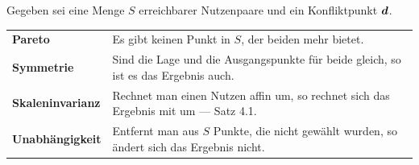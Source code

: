 \begin{merksatz}
Gegeben sei eine Menge $S$ erreichbarer Nutzenpaare und ein Konfliktpunkt $\boldsymbol{d}$.

\begin{center}
{\small
\renewcommand{\arraystretch}{1.55}
\begin{tabular}{@{}P{2.6cm}P{6.0cm}@{}}
\toprule
\textbf{Pareto} & Es gibt keinen Punkt in $S$, der beiden mehr bietet.\\
\textbf{Symmetrie} & Sind die Lage und die Ausgangspunkte für beide gleich, so ist es das Ergebnis auch.\\
\textbf{Skaleninvarianz} & Rechnet man einen Nutzen affin um, so rechnet sich das Ergebnis mit um --- Satz 4.1.\\
\textbf{Unabhängigkeit} & Entfernt man aus $S$ Punkte, die nicht gewählt wurden, so ändert sich das Ergebnis nicht.\\
\bottomrule
\end{tabular}}
\end{center}
\end{merksatz}

